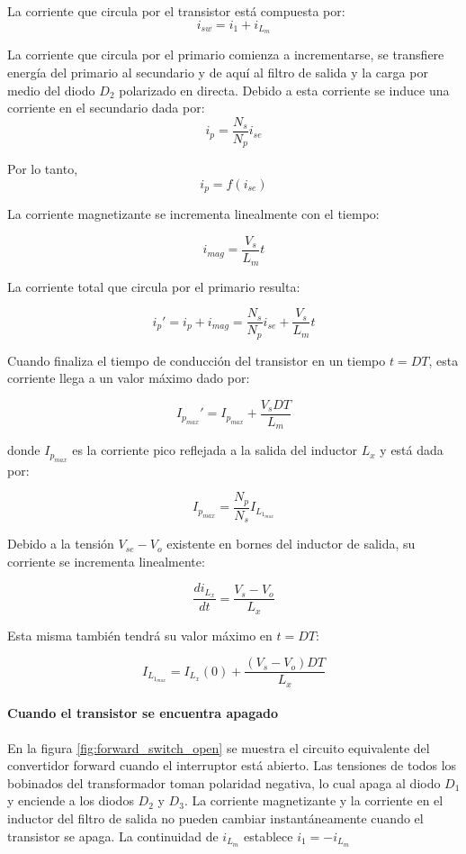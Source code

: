 La corriente que circula por el transistor está compuesta por:
$$ i_{sw}=i_1+i_{L_m} $$


La corriente que circula por el primario comienza a incrementarse,
se transfiere energía del primario al secundario y de aquí al filtro de salida y la carga por medio del diodo $D_2$ polarizado en directa. 
Debido a esta corriente se induce una corriente en el secundario dada por:
$$ i_p=\frac{N_s}{N_p}i_{se} $$

Por lo tanto, 
$$ i_p=f(i_{se}) $$

La corriente magnetizante se incrementa linealmente con el tiempo:

$$ i_{mag}=\frac{V_s}{L_m}t $$

La corriente total que circula por el primario resulta:

$$ i_p'=i_p+i_{mag}=\frac{N_s}{N_p}i_{se}+\frac{V_s}{L_m}t $$

Cuando finaliza el tiempo de conducción del transistor en un tiempo $t=DT$, esta corriente llega a un valor máximo dado por:

$$ I_{p_{max}}'=I_{p_{max}}+\frac{V_sDT}{L_m} $$

donde $I_{p_{max}}$ es la corriente pico reflejada a la salida del inductor $L_x$ y está dada por:

$$ I_{p_{max}}=\frac{N_p}{N_s}I_{L_{1_{max}}} $$

Debido a la tensión $V_{se}-V_o$ existente en bornes del inductor de salida, su corriente se incrementa linealmente:

$$ \frac{di_{L_x}}{dt}=\frac{V_s-V_o}{L_x} $$

Esta misma también tendrá su valor máximo en $t=DT$:

$$ I_{L_{1_{max}}}=I_{L_x}(0)+\frac{(V_s-V_o)DT}{L_x} $$

\paragraph{Cuando el transistor se encuentra apagado}
En la figura \ref{fig:forward_switch_open} se muestra el circuito equivalente del convertidor forward cuando el interruptor está abierto. 
Las tensiones de todos los bobinados del transformador toman polaridad negativa, lo cual apaga al diodo $D_1$ y enciende a los diodos $D_2$ y $D_3$. 
La corriente magnetizante y la corriente en el inductor del filtro de salida no pueden cambiar instantáneamente cuando el transistor se apaga. 
La continuidad de $i_{L_m}$ establece $ i_1=-i_{L_m} $

